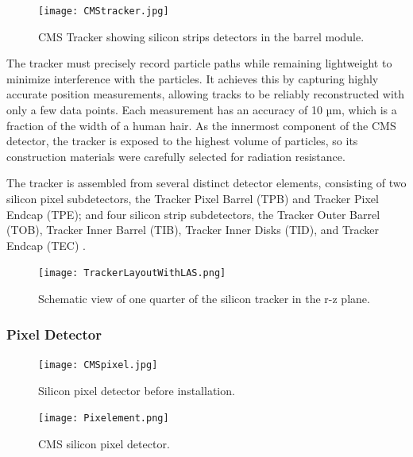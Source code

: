 \begin{figure}[!ht]
    \begin{center}
        \texttt{[image: CMStracker.jpg]}
        \caption{CMS Tracker showing silicon strips detectors in the barrel module.}
        \label{fig:CMStracker}
    \end{center}
\end{figure}

The tracker must precisely record particle paths while remaining lightweight to minimize interference with the particles. 
It achieves this by capturing highly accurate position measurements, allowing tracks to be reliably reconstructed with only a few data points. 
Each measurement has an accuracy of 10 µm, which is a fraction of the width of a human hair. 
As the innermost component of the CMS detector, the tracker is exposed to the highest volume of particles, so its construction materials were carefully selected for radiation resistance.

The tracker is assembled from several distinct detector elements, consisting of two silicon pixel subdetectors, the Tracker Pixel Barrel (TPB) and Tracker Pixel Endcap (TPE); 
and four silicon strip subdetectors, the Tracker Outer Barrel (TOB), Tracker Inner Barrel (TIB), Tracker Inner Disks (TID), and Tracker Endcap (TEC) \cite{Chatrchyan:1667597}.

\begin{figure}[!ht]
    \begin{center}
        \texttt{[image: TrackerLayoutWithLAS.png]}
        \caption{Schematic view of one quarter of the silicon tracker in the r-z plane.}
        \label{fig:CMStracker}
    \end{center}
\end{figure}


\subsubsection{Pixel Detector}

\begin{figure}[!ht]
    \begin{center}
        \texttt{[image: CMSpixel.jpg]}
        \caption{Silicon pixel detector before installation.}
        \label{fig:CMSpixel}
    \end{center}
\end{figure}

\begin{figure}[!ht]
    \begin{center}
        \texttt{[image: Pixelement.png]}
        \caption{CMS silicon pixel detector.}
        \label{fig:CMSpixel}
    \end{center}
\end{figure}

